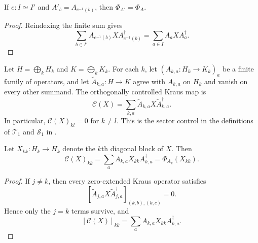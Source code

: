 \begin{theorem}
    \label{thm:mpdo_rectangular_kraus_map_equiv}
    \leanok
    If $e:I\simeq I'$ and $A'_b=A_{e^{-1}(b)}$, then
    $\Phi_{A'}=\Phi_A$.
\end{theorem}
\begin{proof}
    \leanok
    Reindexing the finite sum gives
    \[
        \sum_{b\in I'}A_{e^{-1}(b)}X A_{e^{-1}(b)}^\dagger
        =\sum_{a\in I}A_aXA_a^\dagger.
    \]
\end{proof}

\begin{definition}
    \label{def:mpdo_controlled_kraus_map}
    \leanok
    Let $H=\bigoplus_k H_k$ and $K=\bigoplus_k K_k$. For each $k$, let
    $(A_{k,a}:H_k\to K_k)_a$ be a finite family of operators, and let
    $\widetilde A_{k,a}:H\to K$ agree with $A_{k,a}$ on $H_k$ and vanish on
    every other summand. The orthogonally controlled Kraus map is
    \[
        \mathcal C(X)
        =\sum_{k,a}\widetilde A_{k,a}X\widetilde A_{k,a}^{\dagger}.
    \]
    In particular, $\mathcal C(X)_{kl}=0$ for $k\ne l$. This is the sector
    control in the definitions of $\mathcal T_1$ and $\mathcal S_1$ in
    \cite[Appendix~C.2, lines~1523--1535 and~1548--1555]
      {Cirac2016MPDO_arXiv}.
\end{definition}

\begin{theorem}
    \label{thm:mpdo_controlled_kraus_map_same_block}
    \leanok
    Let $X_{kk}:H_k\to H_k$ denote the $k$th diagonal block of $X$. Then
    \[
        \mathcal C(X)_{kk}
        =\sum_a A_{k,a}X_{kk}A_{k,a}^\dagger
        =\Phi_{A_k}(X_{kk}).
    \]
\end{theorem}
\begin{proof}
    \leanok
    If $j\ne k$, then every zero-extended Kraus operator satisfies
    \[
      [\widetilde A_{j,a}X\widetilde A_{j,a}^\dagger]
        _{(k,b),(k,c)}=0.
    \]
    Hence only the $j=k$ terms survive, and
    \[
      [\mathcal C(X)]_{kk}
      =\sum_a A_{k,a}X_{kk}A_{k,a}^\dagger.
    \]
\end{proof}

